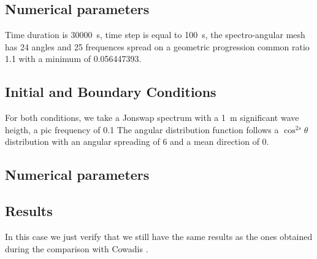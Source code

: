 %
\subsection{Numerical parameters}
%
Time duration is 30000~s, time step is equal to 100~s, the spectro-angular mesh has 24 angles and 25 frequences spread on a geometric progression common ratio 1.1 with a minimum of 0.056447393.

\subsection{Initial and Boundary Conditions}
%
For both conditions, we take a Jonswap spectrum with a 1~m significant wave heigth, a pic frequency of 0.1 The angular distribution function follows a $\cos^{2s} \theta$ distribution with an angular spreading of 6 and a mean direction of 0.

\subsection{Numerical parameters}


%
%
\subsection{Results}
In this case we just verify that we still have the same results as the ones obtained during the comparison with Cowadis \cite{cowadis}.